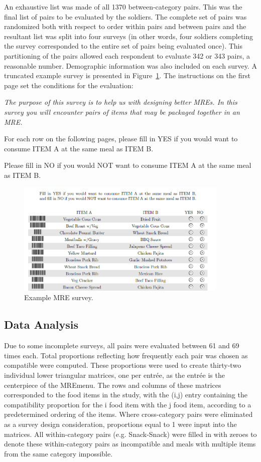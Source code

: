 An exhaustive list was made of all 1370 between-category pairs.  This was the final list of pairs to be evaluated by the soldiers.  The complete set of pairs was randomized both with respect to order within pairs and between pairs and the resultant list was split into four surveys (in other words, four soldiers completing the survey corresponded to the entire set of pairs being evaluated once).  This partitioning of the pairs allowed each respondent to evaluate 342 or 343 pairs, a reasonable number.  Demographic information was also included on each survey.  A truncated example survey is presented in Figure~\ref{fig:mresurvey}.  The instructions on the first page set the conditions for the evaluation:

\noindent
{\it The purpose of this survey is to help us with designing better MREs. In this survey you will encounter pairs of items that may be packaged together in an MRE.

\noindent
For each row on the following pages, please fill in YES if you would want to consume ITEM A at the same meal as ITEM B.

\noindent
Please fill in NO if you would NOT want to consume ITEM A at the same meal as ITEM B.}

\begin{figure}[h!]
\caption{Example MRE survey.}
\label{fig:mresurvey}
\centering
\includegraphics[width=0.9\textwidth]{./img/Figure51.png}
\end{figure}

\subsection{Data Analysis}
Due to some incomplete surveys, all pairs were evaluated between 61 and 69 times each.  Total proportions reflecting how frequently each pair was chosen as compatible were computed.  These proportions were used to create thirty-two individual lower triangular matrices, one per entrée, as the entrée is the centerpiece of the MRE\tm menu.  The rows and columns of these matrices corresponded to the food items in the study, with the (i,j) entry containing the compatibility proportion for the i food item with the j food item, according to a predetermined ordering of the items.  Where cross-category pairs were eliminated as a survey design consideration, proportions equal to 1 were input into the matrices.  All within-category pairs (e.g. Snack-Snack) were filled in with zeroes to denote these within-category pairs as incompatible and meals with multiple items from the same category impossible.

